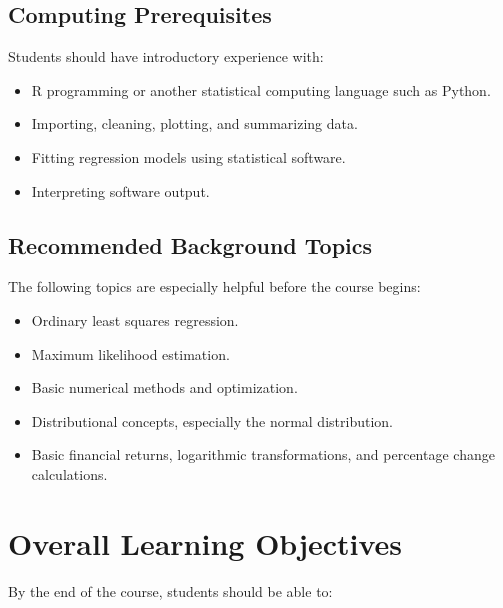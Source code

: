 \documentclass[11pt]{article}
\begin{document}
\subsection{Computing Prerequisites}

Students should have introductory experience with:
\begin{itemize}
    \item R programming or another statistical computing language such as Python.
    \item Importing, cleaning, plotting, and summarizing data.
    \item Fitting regression models using statistical software.
    \item Interpreting software output.
\end{itemize}

\subsection{Recommended Background Topics}

The following topics are especially helpful before the course begins:
\begin{itemize}
    \item Ordinary least squares regression.
    \item Maximum likelihood estimation.
    \item Basic numerical methods and optimization.
    \item Distributional concepts, especially the normal distribution.
    \item Basic financial returns, logarithmic transformations, and percentage change calculations.
\end{itemize}

\section{Overall Learning Objectives}

By the end of the course, students should be able to:
\end{document}
